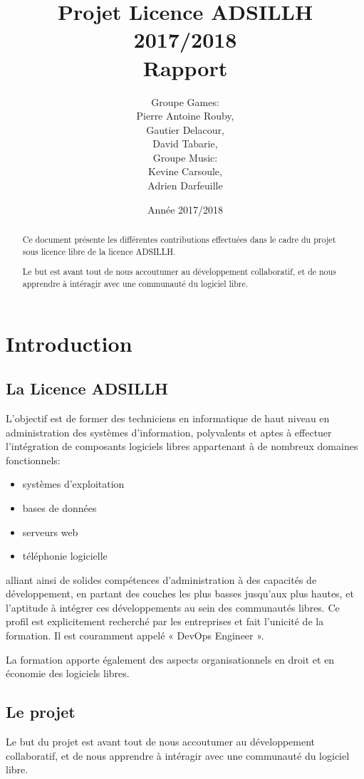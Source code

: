 \documentclass[12pt]{report}
\title{Projet Licence ADSILLH 2017/2018\\Rapport}
\author{Groupe Games:\\ Pierre Antoine Rouby,\\ Gautier Delacour,\\
  \vspace{0.8cm}
  David Tabarie,\\ Groupe Music:\\ Kevine Carsoule,\\ Adrien Darfeuille}
\date{Année 2017/2018}
\begin{document}
\maketitle

\begin{abstract}
Ce document présente les différentes contributions effectuées dans le cadre du projet sous licence libre de la licence ADSILLH.

Le but est avant tout de nous accoutumer au développement
collaboratif, et de nous apprendre à intéragir avec une communauté
du logiciel libre.
\end{abstract}

\tableofcontents


\chapter{Introduction}

\section{La Licence ADSILLH}
L'objectif est de former des techniciens en informatique de haut
niveau en administration des systèmes d'information, polyvalents et
aptes à effectuer l'intégration de composants logiciels libres
appartenant à de nombreux domaines fonctionnels:
\begin{itemize}
\item systèmes d'exploitation
\item bases de données
\item serveurs web
\item téléphonie logicielle
\end{itemize}

alliant ainsi de solides compétences d'administration à des capacités
de développement, en partant des couches les plus basses jusqu'aux
plus hautes, et l'aptitude à intégrer ces développements au sein des
communautés libres. Ce profil est explicitement recherché par les
entreprises et fait l'unicité de la formation. Il est couramment
appelé « DevOps Engineer ».

La formation apporte également des aspects organisationnels en droit
et en économie des logiciels libres.

\section{Le projet}
Le but du projet est avant tout de nous accoutumer au développement
collaboratif, et de nous apprendre à intéragir avec une communauté
du logiciel libre.
\end{document}
